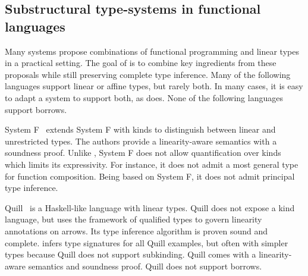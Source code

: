 \subsection{Substructural type-systems in functional languages}

Many systems propose combinations of
functional programming and linear types in a practical setting.
The goal of \lang is to combine key ingredients
from these proposals while still preserving
complete type inference.
Many of the following languages support linear or affine types, but rarely
both. In many cases, it is easy to adapt a system to support both, as
\lang does.
None of the following languages support borrows.


System F\degree~\citep{DBLP:conf/tldi/MazurakZZ10}
extends System F with kinds to distinguish
between linear and unrestricted types.
The authors provide
a linearity-aware semantics with a soundness proof.
Unlike \lang, System F\degree{} does not allow
quantification over kinds which limits its expressivity. For instance, it
does not admit a most general type for function composition.
Being based on System F, it does not admit
principal type inference.

Quill~\citep{DBLP:conf/icfp/Morris16} is a Haskell-like language with linear
types.
Quill does not expose a kind language, but
uses the framework of qualified types to govern linearity annotations on arrows.
Its type inference algorithm is proven sound and complete.
\lang infers type signatures for all Quill examples, but often with
simpler types because Quill does not support subkinding.
Quill comes with a linearity-aware semantics and soundness proof.
Quill does not support borrows.


